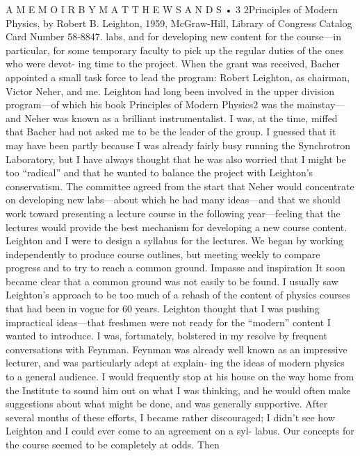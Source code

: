 \documentclass[10pt,oneside]{article}
\begin{document}
A  M E M O I R  B Y  M A T T H E W  S A N D S • 3 2Principles of Modern Physics, by Robert B. Leighton, 1959, McGraw-Hill, Library of Congress Catalog Card Number 58-8847. labs, and for developing new content for the course---in particular, for some temporary faculty to pick up the regular duties of the ones who were devot- ing time to the project. When the grant was received, Bacher appointed a small task force to lead the program: Robert Leighton, as chairman, Victor Neher, and me. Leighton had long been involved in the upper division program---of which his book Principles of Modern Physics2 was the mainstay---and Neher was known as a brilliant instrumentalist. I was, at the time, miffed that Bacher had not asked me to be the leader of the group. I guessed that it may have been partly because I was already fairly busy running the Synchrotron Laboratory, but I have always thought that he was also worried that I might be too “radical” and that he wanted to balance the project with Leighton’s conservatism. The committee agreed from the start that Neher would concentrate on developing new labs---about which he had many ideas---and that we should work toward presenting a lecture course in the following year---feeling that the lectures would provide the best mechanism for developing a new course content. Leighton and I were to design a syllabus for the lectures. We began by working independently to produce course outlines, but meeting weekly to compare progress and to try to reach a common ground. Impasse and inspiration It soon became clear that a common ground was not easily to be found. I usually saw Leighton’s approach to be too much of a rehash of the content of physics courses that had been in vogue for 60 years. Leighton thought that I was pushing impractical ideas---that freshmen were not ready for the “modern” content I wanted to introduce. I was, fortunately, bolstered in my resolve by frequent conversations with Feynman. Feynman was already well known as an impressive lecturer, and was particularly adept at explain- ing the ideas of modern physics to a general audience. I would frequently stop at his house on the way home from the Institute to sound him out on what I was thinking, and he would often make suggestions about what might be done, and was generally supportive. After several months of these efforts, I became rather discouraged; I didn’t see how Leighton and I could ever come to an agreement on a syl- labus. Our concepts for the course seemed to be completely at odds. Then\par
\end{document}
